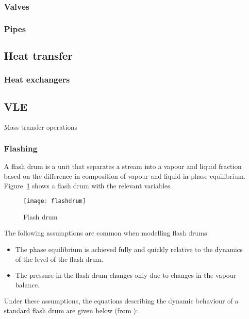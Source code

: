 \subsubsection{Valves}


\subsubsection{Pipes}


\subsection{Heat transfer}
\subsubsection{Heat exchangers}


\subsection{VLE}
Mass transfer operations 



\subsubsection{Flashing}
A flash drum is a unit that separates a stream into a vapour and
liquid fraction based on the difference in composition of vapour and
liquid in phase equilibrium.  Figure~\ref{fig:flashdrum} shows a flash
drum with the relevant variables.

\begin{figure}[htbp]
  \centering
  \texttt{[image: flashdrum]}
  \caption{Flash drum}
  \label{fig:flashdrum}
\end{figure}

The following assumptions are common when modelling flash drums:

\begin{itemize}
\item The phase equilibrium is achieved fully and quickly relative to
  the dynamics of the level of the flash drum.
\item The pressure in the flash drum changes only due to changes in
  the vapour balance.
\end{itemize}

Under these assumptions, the equations describing the dynamic
behaviour of a standard flash drum are given below (from \citet{eich-soellner_stationary_1997}):

